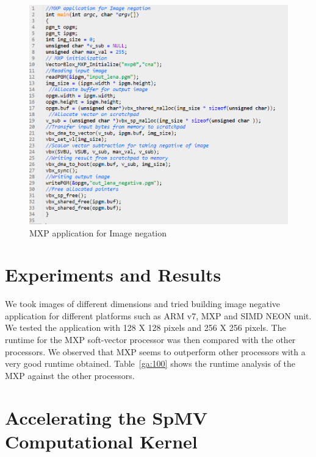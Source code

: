 \begin{figure}
	\centering
	\includegraphics[width=1\textwidth]{images/code2.png}
	\caption{MXP application for Image negation}
	\label{cod:7}
\end{figure}


%

\section{Experiments and Results}

We took images of different dimensions and tried building image negative application for different platforms such as ARM v7, MXP and SIMD NEON unit. We tested the application with 128 X 128 pixels and 256 X 256 pixels. The runtime for the MXP soft-vector processor was then compared with the other processors. We observed that MXP seems to outperform other processors with a very good runtime obtained.  Table~\ref{ga:100} shows the runtime analysis of the MXP against the other processors.





\section{Accelerating the SpMV Computational Kernel}

